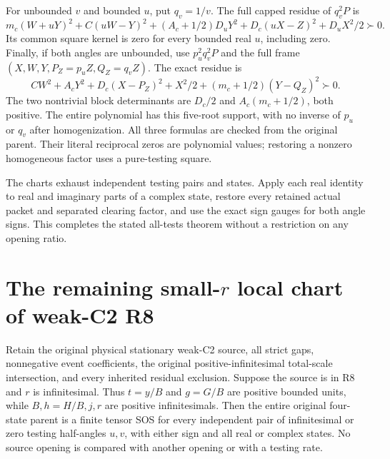 For unbounded $v$ and bounded $u$, put $q_v=1/v$. The full capped
residue of $q_v^2P$ is
\[
 m_c(W+uY)^2+C(uW-Y)^2+(A_c+1/2)D_uY^2
                         +D_c(uX-Z)^2+D_uX^2/2\succ0.           \tag{RU29}
\]
Its common square kernel is zero for every bounded real $u$,
including zero. Finally, if both angles are unbounded, use
$p_u^2q_v^2P$ and the full frame
$(X,W,Y,P_Z=p_uZ,Q_Z=q_vZ)$. The exact residue is
\[
 CW^2+A_cY^2+D_c(X-P_Z)^2+X^2/2
                           +(m_c+1/2)(Y-Q_Z)^2\succ0.           \tag{RU30}
\]
The two nontrivial block determinants are $D_c/2$ and
$A_c(m_c+1/2)$, both positive. The entire polynomial has this
five-root support, with no inverse of $p_u$ or $q_v$ after
homogenization. All three formulas are checked from the original
parent. Their literal reciprocal zeros are polynomial values;
restoring a nonzero homogeneous factor uses a pure-testing square.

The charts exhaust independent testing pairs and states. Apply each
real identity to real and imaginary parts of a complex state, restore
every retained actual packet and separated clearing factor, and use
the exact sign gauges for both angle signs. This completes the stated
all-tests theorem without a restriction on any opening ratio.



\section{\texorpdfstring{The remaining small-$r$ local chart of weak-C2 R8}{The remaining small-r local chart of weak-C2 R8}}
\label{component:p482fcad1a2e2}

\label{p482fcad1a2e2:sec:r17-r8-small-r}

\begin{theorem}
Retain the original physical stationary weak-C2 source, all strict gaps,
nonnegative event coefficients, the original positive-infinitesimal
total-scale intersection, and every inherited residual exclusion.
Suppose the source is in R8 and $r$ is infinitesimal. Thus $t=y/B$
and $g=G/B$ are positive bounded units, while $B,h=H/B,j,r$ are
positive infinitesimals. Then the entire original four-state parent is
a finite tensor SOS for every independent pair of infinitesimal or zero
testing half-angles $u,v$, with either sign and all real or complex states.
No source opening is compared with another opening or with a testing rate.
\end{theorem}

